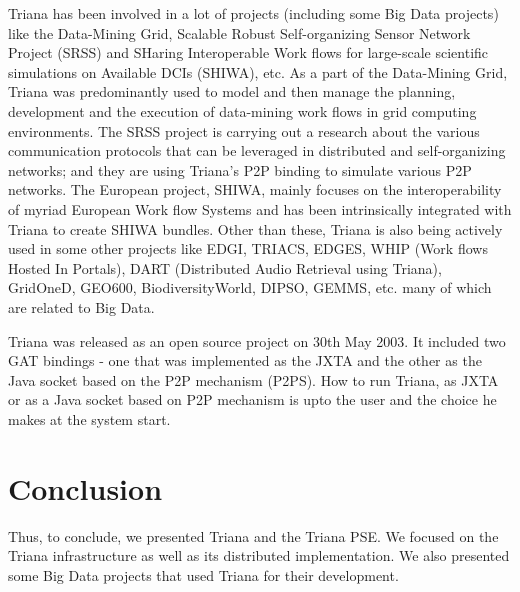 \documentclass[9pt,twocolumn,twoside]{styles/osajnl}
\begin{document}
\cite{Triana-projects} Triana has been involved in a lot of projects
(including some Big Data projects) like the
\cite{Triana-Data-Mining-Grid} Data-Mining Grid, \cite{Triana-SRSS}
Scalable Robust Self-organizing Sensor Network Project (SRSS) and
\cite{Triana-SHIWA} SHaring Interoperable Work flows for large-scale
scientific simulations on Available DCIs (SHIWA), etc.  As a part of
the Data-Mining Grid, Triana was predominantly used to model and then
manage the planning, development and the execution of data-mining work
flows in grid computing environments.  \cite{Triana-SRSS} The SRSS
project is carrying out a research about the various communication
protocols that can be leveraged in distributed and self-organizing
networks; and they are using Triana's P2P binding to simulate various
P2P networks.  The European project, SHIWA, mainly focuses on the
interoperability of myriad European Work flow Systems and has been
intrinsically integrated with Triana to create \cite{Triana-SHIWA}
SHIWA bundles.  Other than these, Triana is also being actively used
in some other projects like EDGI, TRIACS, EDGES, WHIP (Work flows
Hosted In Portals), DART (Distributed Audio Retrieval using Triana),
GridOneD, GEO600, BiodiversityWorld, DIPSO, GEMMS, etc. many of which
are related to Big Data.

Triana was released as an open source project on 30th May 2003. It 
included two GAT bindings - one that was implemented as the JXTA and the 
other as the Java socket based on the P2P mechanism (P2PS). How to run 
Triana, as JXTA or as a Java socket based on P2P mechanism is upto the 
user and the choice he makes at the system start. 

\section{Conclusion}

Thus, to conclude, we presented Triana and the Triana PSE.  We focused
on the Triana infrastructure as well as its distributed
implementation.  We also presented some Big Data projects that used
Triana for their development.



\end{document}
